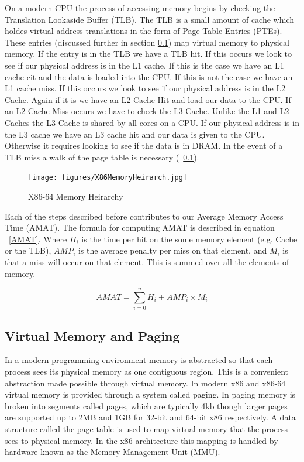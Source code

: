 On a modern CPU the process of accessing memory begins by checking the Translation Lookaside Buffer (TLB). The TLB is a small amount of cache which holdes virtual address translations in the form of Page Table Entries (PTEs). These entries (discussed further in section \ref{PageTable}) map virtual memory to physical memory. If the entry is in the TLB we have a TLB hit.  If this occurs we look to see if our physical address is in the L1 cache. If this is the case we have an L1 cache cit and the data is loaded into the CPU. If this is not the case we have an L1 cache miss. If this occurs we look to see if our physical address is in the L2 Cache. Again if it is we have an L2 Cache Hit and load our data to the CPU. If an L2 Cache Miss occurs we have to check the L3 Cache. Unlike the L1 and L2 Caches the L3 Cache is shared by all cores on a CPU. If our physical address is in the L3 cache we have an L3 cache hit and our data is given to the CPU. Otherwise it requires looking to see if the data is in DRAM. In the event of a TLB miss a walk of the page table is necessary (~\ref{PageTable}). 
\begin{figure}\label{X86Mem}
	  \centering
	  \texttt{[image: figures/X86MemoryHeirarch.jpg]}
	  \caption{X86-64 Memory Heirarchy}
\end{figure}

Each of the steps described before contributes to our Average Memory Access Time (AMAT). The formula for computing AMAT is described in equation ~\ref{AMAT}. Where $H_i$ is the time per hit on the some memory element (e.g. Cache or the TLB), $AMP_i$ is the average penalty per miss on that element, and $M_i$ is that a miss will occur on that element. This is summed over all the elements of memory. 

\begin{equation}\label{AMAT}
	AMAT = \sum_{i=0}^{n}{H_i+AMP_i\times M_i}
\end{equation}

\subsection{Virtual Memory and Paging}\label{PageTable}

In a modern programming environment memory is abstracted so that each process sees its physical memory as one contiguous region.  This is a convenient abstraction made possible through virtual memory. In modern x86 and x86-64 virtual memory is provided through a system called paging. In paging memory is broken into segments called pages, which are typically 4kb though larger pages are supported up to 2MB and 1GB for 32-bit and 64-bit x86 respectively. A data structure called the page table is used to map virtual memory that the process sees to physical memory. In the x86 architecture this mapping is handled by hardware known as the Memory Management Unit (MMU). 

